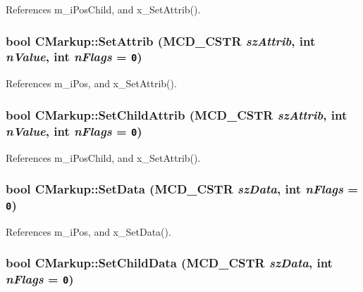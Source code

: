 References m\_\-iPosChild, and x\_\-SetAttrib().
\subsubsection[SetAttrib]{\setlength{\rightskip}{0pt plus 5cm}bool CMarkup::SetAttrib ({\bf MCD\_\-CSTR} {\em szAttrib}, \/  int {\em nValue}, \/  int {\em nFlags} = {\tt 0})\hspace{0.3cm}{\tt  [inline]}}\label{classCMarkup_a1b52eb318133c539e5eaf23915321ad}




References m\_\-iPos, and x\_\-SetAttrib().
\subsubsection[SetChildAttrib]{\setlength{\rightskip}{0pt plus 5cm}bool CMarkup::SetChildAttrib ({\bf MCD\_\-CSTR} {\em szAttrib}, \/  int {\em nValue}, \/  int {\em nFlags} = {\tt 0})\hspace{0.3cm}{\tt  [inline]}}\label{classCMarkup_17d99292ae941bb12e4a10a285efd363}




References m\_\-iPosChild, and x\_\-SetAttrib().
\subsubsection[SetData]{\setlength{\rightskip}{0pt plus 5cm}bool CMarkup::SetData ({\bf MCD\_\-CSTR} {\em szData}, \/  int {\em nFlags} = {\tt 0})\hspace{0.3cm}{\tt  [inline]}}\label{classCMarkup_65f994e7c180c9e02cb8a3deb9cc1a32}




References m\_\-iPos, and x\_\-SetData().
\subsubsection[SetChildData]{\setlength{\rightskip}{0pt plus 5cm}bool CMarkup::SetChildData ({\bf MCD\_\-CSTR} {\em szData}, \/  int {\em nFlags} = {\tt 0})\hspace{0.3cm}{\tt  [inline]}}\label{classCMarkup_b2db581de961cbdf0004e9377029a8c7}





